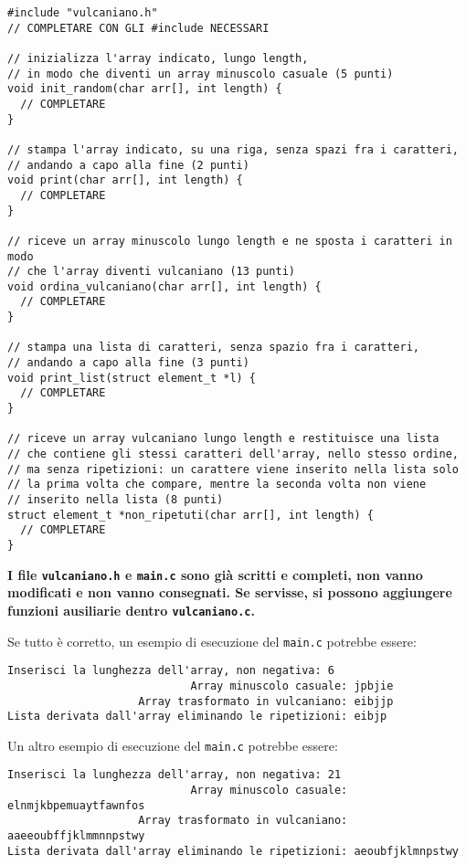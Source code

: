 \documentclass[12pt]{article}
\begin{document}
\begin{center}
  \begin{lstlisting}[language=myC]
#include "vulcaniano.h"
// COMPLETARE CON GLI #include NECESSARI

// inizializza l'array indicato, lungo length,
// in modo che diventi un array minuscolo casuale (5 punti)
void init_random(char arr[], int length) {
  // COMPLETARE
}

// stampa l'array indicato, su una riga, senza spazi fra i caratteri,
// andando a capo alla fine (2 punti)
void print(char arr[], int length) {
  // COMPLETARE
}

// riceve un array minuscolo lungo length e ne sposta i caratteri in modo
// che l'array diventi vulcaniano (13 punti)
void ordina_vulcaniano(char arr[], int length) {
  // COMPLETARE
}

// stampa una lista di caratteri, senza spazio fra i caratteri,
// andando a capo alla fine (3 punti)
void print_list(struct element_t *l) {
  // COMPLETARE
}

// riceve un array vulcaniano lungo length e restituisce una lista
// che contiene gli stessi caratteri dell'array, nello stesso ordine,
// ma senza ripetizioni: un carattere viene inserito nella lista solo
// la prima volta che compare, mentre la seconda volta non viene
// inserito nella lista (8 punti)
struct element_t *non_ripetuti(char arr[], int length) {
  // COMPLETARE
}
  \end{lstlisting}
\end{center}

\begin{mdframed}[backgroundcolor=lightred] 
  \textbf{I file \texttt{vulcaniano.h} e \texttt{main.c} sono gi\`a scritti e completi, non vanno modificati e non vanno consegnati. Se servisse, si possono aggiungere funzioni ausiliarie dentro \texttt{vulcaniano.c}.}
\end{mdframed}

\vspace*{5ex}
Se tutto \`e corretto,
un esempio di esecuzione del \texttt{main.c} potrebbe essere:

\begin{mdframed}[backgroundcolor=verylightgray] 
\begin{verbatim}
Inserisci la lunghezza dell'array, non negativa: 6
                            Array minuscolo casuale: jpbjie
                    Array trasformato in vulcaniano: eibjjp
Lista derivata dall'array eliminando le ripetizioni: eibjp
\end{verbatim}
\end{mdframed}

Un altro esempio di esecuzione del \texttt{main.c} potrebbe essere:

\begin{mdframed}[backgroundcolor=verylightgray] 
\begin{verbatim}
Inserisci la lunghezza dell'array, non negativa: 21
                            Array minuscolo casuale: elnmjkbpemuaytfawnfos
                    Array trasformato in vulcaniano: aaeeoubffjklmmnnpstwy
Lista derivata dall'array eliminando le ripetizioni: aeoubfjklmnpstwy
\end{verbatim}
\end{mdframed}
\end{document}
